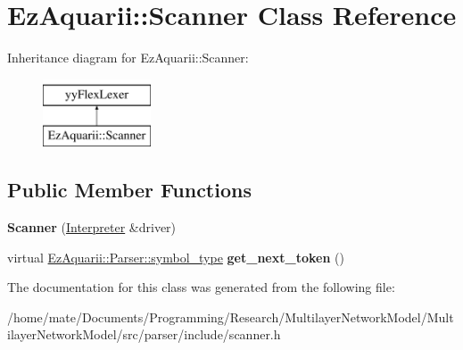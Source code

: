 \hypertarget{classEzAquarii_1_1Scanner}{}\section{Ez\+Aquarii\+:\+:Scanner Class Reference}
\label{classEzAquarii_1_1Scanner}
Inheritance diagram for Ez\+Aquarii\+:\+:Scanner\+:\begin{figure}[H]
\begin{center}
\leavevmode
\includegraphics[height=2.000000cm]{classEzAquarii_1_1Scanner}
\end{center}
\end{figure}
\subsection*{Public Member Functions}
\begin{DoxyCompactItemize}
\item 
{\bfseries Scanner} (\hyperlink{classEzAquarii_1_1Interpreter}{Interpreter} \&driver)\hypertarget{classEzAquarii_1_1Scanner_ac9e5d9ea1525e795669228e37d9e33c6}{}\label{classEzAquarii_1_1Scanner_ac9e5d9ea1525e795669228e37d9e33c6}

\item 
virtual \hyperlink{classEzAquarii_1_1Parser_a219e44a6cf61b8a88cf0db8d5bb7be5d}{Ez\+Aquarii\+::\+Parser\+::symbol\+\_\+type} {\bfseries get\+\_\+next\+\_\+token} ()\hypertarget{classEzAquarii_1_1Scanner_aa90a8f3bdbdee9301d9e155be3238f2d}{}\label{classEzAquarii_1_1Scanner_aa90a8f3bdbdee9301d9e155be3238f2d}

\end{DoxyCompactItemize}


The documentation for this class was generated from the following file\+:\begin{DoxyCompactItemize}
\item 
/home/mate/\+Documents/\+Programming/\+Research/\+Multilayer\+Network\+Model/\+Multilayer\+Network\+Model/src/parser/include/scanner.\+h\end{DoxyCompactItemize}
